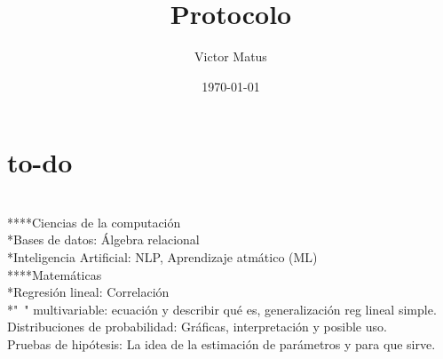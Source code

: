\documentclass[letterpaper]{article}
\author{Victor Matus}
\title{Protocolo}
\date{\today}
\begin{document}
\tableofcontents
\section {to-do}\ \\
****Ciencias de la computación\\
*Bases de datos: Álgebra relacional\\
*Inteligencia Artificial: NLP, Aprendizaje atmático (ML)\\
****Matemáticas\\
*Regresión lineal: Correlación\\
*"\ " multivariable: ecuación y describir qué es, generalización reg lineal simple.\\
Distribuciones de probabilidad: Gráficas, interpretación y posible uso.\\
Pruebas de hipótesis: La idea de la estimación de parámetros y para que sirve.\\
\pagebreak
\end{document}

